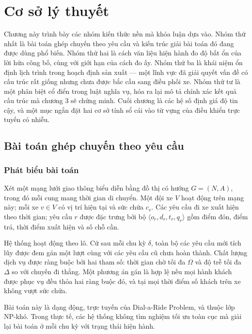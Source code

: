 \chapter{Cơ sở lý thuyết}

Chương này trình bày các nhóm kiến thức nền mà khóa luận dựa vào. Nhóm thứ nhất là bài toán
ghép chuyến theo yêu cầu và kiến trúc giải bài toán đó đang được dùng phổ biến. Nhóm thứ hai
là cách văn liệu hiện hành đo độ bất ổn của lời hứa công bố, cùng với giới hạn của cách đo ấy.
Nhóm thứ ba là khái niệm ổn định lịch trình trong hoạch định sản xuất --- một lĩnh vực đã giải
quyết vấn đề có cấu trúc rất giống nhưng chưa được bắc cầu sang điều phối xe. Nhóm thứ tư là
một phân biệt cổ điển trong luật nghĩa vụ, hóa ra lại mô tả chính xác kết quả cấu trúc mà
chương 3 sẽ chứng minh. Cuối chương là các hệ số định giá độ tin cậy, và một mục ngắn đặt hai cơ
sở tính sổ cái vào từ vựng của điều khiển trực tuyến có nhiễu.

\section{Bài toán ghép chuyến theo yêu cầu}

\subsection{Phát biểu bài toán}

Xét một mạng lưới giao thông biểu diễn bằng đồ thị có hướng $G=(N,A)$, trong đó mỗi cung mang
thời gian di chuyển. Một đội xe $V$ hoạt động trên mạng này; mỗi xe $v \in V$ có vị trí hiện
tại và sức chứa $c_v$. Các yêu cầu đi xe xuất hiện theo thời gian; yêu cầu $r$ được đặc trưng
bởi bộ $\langle o_r, d_r, t_r, q_r \rangle$ gồm điểm đón, điểm trả, thời điểm xuất hiện và số
chỗ cần.

Hệ thống hoạt động theo lô. Cứ sau mỗi chu kỳ $\delta$, toàn bộ các yêu cầu mới tích lũy được
đem gán một lượt cùng với các yêu cầu cũ chưa hoàn thành. Chất lượng dịch vụ được ràng buộc
bởi hai tham số: thời gian chờ tối đa $\Omega$ và độ trễ tối đa $\Delta$ so với chuyến đi
thẳng. Một phương án gán là hợp lệ nếu mọi hành khách được phục vụ đều thỏa hai ràng buộc đó,
và tại mọi thời điểm số khách trên xe không vượt sức chứa.

Bài toán này là dạng động, trực tuyến của Dial-a-Ride Problem, và thuộc lớp NP-khó. Trong thực
tế, các hệ thống không tìm nghiệm tối ưu toàn cục mà giải lại bài toán ở mỗi chu kỳ với trạng
thái hiện hành.

